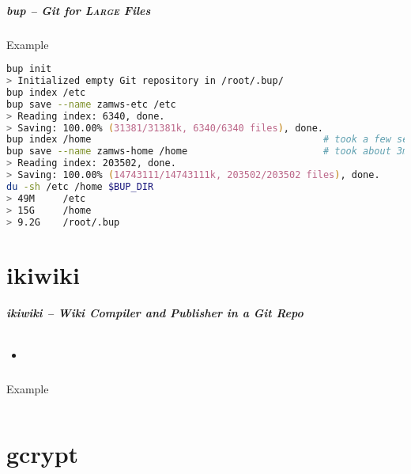 \documentclass[english,hyperref={pdfpagelabels=false},aspectratio=169]{beamer}
\begin{document}
\begin{frame}[fragile]
  \frametitle{bup -- Git for \textsc{Large} Files}
  \begin{block}{Example}
    \vspace{-0.75em}
    \begin{lstlisting}[language=zsh]
bup init
> Initialized empty Git repository in /root/.bup/
bup index /etc
bup save --name zamws-etc /etc
> Reading index: 6340, done.
> Saving: 100.00% (31381/31381k, 6340/6340 files), done.
bup index /home                                         # took a few seconds
bup save --name zamws-home /home                        # took about 3min
> Reading index: 203502, done.
> Saving: 100.00% (14743111/14743111k, 203502/203502 files), done.
du -sh /etc /home $BUP_DIR
> 49M     /etc
> 15G     /home
> 9.2G    /root/.bup
    \end{lstlisting}
    \vspace{-0.75em}
  \end{block}
\end{frame}


\part{ikiwiki}
\makepart

\begin{frame}[label=ikiwiki]
  \frametitle{ikiwiki -- Wiki Compiler and Publisher in a Git Repo}
  \framesubtitle{}
  \begin{itemize}
    \item 
  \end{itemize}
\end{frame}

\begin{frame}[fragile]
  \frametitle{}
  \begin{block}{Example}
    \vspace{-0.75em}
    \begin{lstlisting}

    \end{lstlisting}
    \vspace{-0.75em}
  \end{block}
\end{frame}


\part{gcrypt}
\makepart
\end{document}
